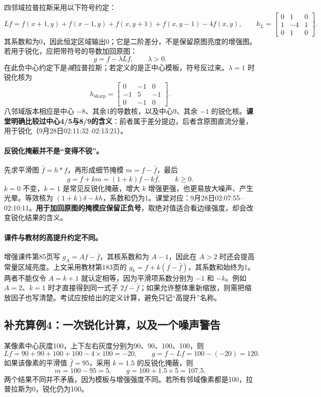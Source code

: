 四邻域拉普拉斯采用以下符号约定：
\[
Lf=f(x+1,y)+f(x-1,y)+f(x,y+1)+f(x,y-1)-4f(x,y),
\qquad
h_L=\begin{bmatrix}0&1&0\\1&-4&1\\0&1&0\end{bmatrix}.
\]
其系数和为0，因此恒定区域输出0；它是二阶差分，不是保留原图亮度的增强图。若用于锐化，应把带符号的导数加回原图：
\[
g=f-\lambda Lf,\qquad \lambda>0.
\]
在此负中心约定下是\emph{减}拉普拉斯；若定义的是正中心模板，符号反过来。$\lambda=1$ 时锐化核为
\[
h_{\mathrm{sharp}}=\begin{bmatrix}0&-1&0\\-1&5&-1\\0&-1&0\end{bmatrix}.
\]
八邻域版本相应是中心 $-8$、其余1的导数核，以及中心9、其余 $-1$ 的锐化核。\textbf{课堂明确比较过中心4/5与8/9的含义}：前者属于差分提边，后者含原图直流分量，用于锐化（9月28日02:11:32--02:13:21）。

\paragraph{反锐化掩蔽并不是“变得不锐”。}
先求平滑图 $\bar f=h*f$，再形成细节掩模 $m=f-\bar f$，最后
\[
g=f+km=(1+k)f-k\bar f,\qquad k\geq0.
\]
$k=0$ 不变，$k=1$ 是常见反锐化掩蔽，增大 $k$ 增强更强，也更易放大噪声、产生光晕。等效核为 $(1+k)\delta-kh$，系数和仍为1。课堂对应：9月28日02:07:55--02:10:11。\textbf{用于加回原图的掩模应保留正负号}，取绝对值适合看边缘强度，却会改变锐化结果的含义。

\paragraph{课件与教材的高提升约定不同。}
增强课件第85页写 $g_A=Af-\bar f$，其核系数和为 $A-1$，因此在 $A>2$ 时还会提高常量区域亮度。上文采用教材第183页的 $g_k=f+k(f-\bar f)$，其系数和始终为1。两者不能仅令 $A=k+1$ 就认定相等，因为平滑项系数分别为 $-1$ 和 $-k$。例如 $A=2$、$k=1$ 时才直接得到同一式子 $2f-\bar f$；如果允许整体重新缩放，则需把缩放因子也写清楚。考试应按给出的定义计算，避免只记“高提升”名称。

\subsection{补充算例4：一次锐化计算，以及一个噪声警告}
某像素中心灰度100，上下左右灰度分别为90、90、100、100，则
\[
Lf=90+90+100+100-4\times100=-20,
\qquad g=f-Lf=100-(-20)=120.
\]
如果该像素的平滑值 $\bar f=95$，采用 $k=1.5$ 的反锐化掩蔽，则
\[
m=100-95=5,\qquad g=100+1.5\times5=107.5.
\]
两个结果不同并不矛盾，因为模板与增强强度不同。若所有邻域像素都是100，拉普拉斯为0，锐化仍为100。

